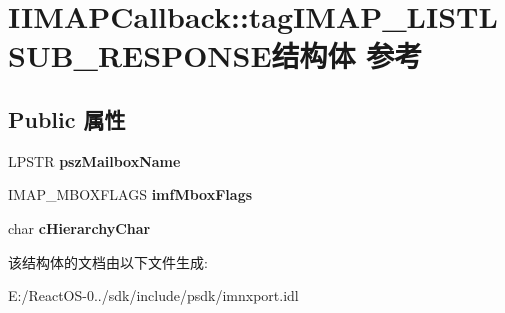 \hypertarget{struct_i_i_m_a_p_callback_1_1tag_i_m_a_p___l_i_s_t_l_s_u_b___r_e_s_p_o_n_s_e}{}\section{I\+I\+M\+A\+P\+Callback\+:\+:tag\+I\+M\+A\+P\+\_\+\+L\+I\+S\+T\+L\+S\+U\+B\+\_\+\+R\+E\+S\+P\+O\+N\+S\+E结构体 参考}
\label{struct_i_i_m_a_p_callback_1_1tag_i_m_a_p___l_i_s_t_l_s_u_b___r_e_s_p_o_n_s_e}
\subsection*{Public 属性}
\begin{DoxyCompactItemize}
\item 
\mbox{\label{struct_i_i_m_a_p_callback_1_1tag_i_m_a_p___l_i_s_t_l_s_u_b___r_e_s_p_o_n_s_e_ab4efe0a3b583900ce11411060632165d}} 
L\+P\+S\+TR {\bfseries psz\+Mailbox\+Name}
\item 
\mbox{\label{struct_i_i_m_a_p_callback_1_1tag_i_m_a_p___l_i_s_t_l_s_u_b___r_e_s_p_o_n_s_e_ae99ad7b1ae39dcc778fe383187bc153c}} 
I\+M\+A\+P\+\_\+\+M\+B\+O\+X\+F\+L\+A\+GS {\bfseries imf\+Mbox\+Flags}
\item 
\mbox{\label{struct_i_i_m_a_p_callback_1_1tag_i_m_a_p___l_i_s_t_l_s_u_b___r_e_s_p_o_n_s_e_aadd1a514d782ced0205e27ba70bbd961}} 
char {\bfseries c\+Hierarchy\+Char}
\end{DoxyCompactItemize}


该结构体的文档由以下文件生成\+:\begin{DoxyCompactItemize}
\item 
E\+:/\+React\+O\+S-\/0../sdk/include/psdk/imnxport.\+idl\end{DoxyCompactItemize}
